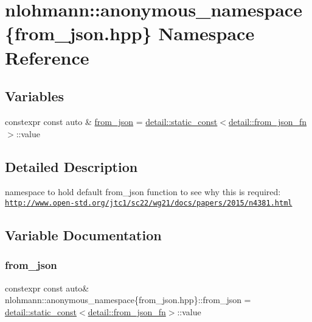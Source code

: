 \hypertarget{namespacenlohmann_1_1anonymous__namespace_02from__json_8hpp_03}{}\section{nlohmann\+:\+:anonymous\+\_\+namespace\{from\+\_\+json.\+hpp\} Namespace Reference}
\label{namespacenlohmann_1_1anonymous__namespace_02from__json_8hpp_03}
\subsection*{Variables}
\begin{DoxyCompactItemize}
\item 
constexpr const auto \& \hyperlink{namespacenlohmann_1_1anonymous__namespace_02from__json_8hpp_03_a8da2cbc27f4ff99aff5c20428fbcce4c}{from\+\_\+json} = \hyperlink{structnlohmann_1_1detail_1_1static__const}{detail\+::static\+\_\+const}$<$\hyperlink{structnlohmann_1_1detail_1_1from__json__fn}{detail\+::from\+\_\+json\+\_\+fn}$>$\+::value
\end{DoxyCompactItemize}


\subsection{Detailed Description}
namespace to hold default {\ttfamily from\+\_\+json} function to see why this is required\+: \href{http://www.open-std.org/jtc1/sc22/wg21/docs/papers/2015/n4381.html}{\tt http\+://www.\+open-\/std.\+org/jtc1/sc22/wg21/docs/papers/2015/n4381.\+html} 

\subsection{Variable Documentation}
\mbox{\label{namespacenlohmann_1_1anonymous__namespace_02from__json_8hpp_03_a8da2cbc27f4ff99aff5c20428fbcce4c}} 
\subsubsection{\texorpdfstring{from\+\_\+json}{from\_json}}
{\footnotesize\ttfamily constexpr const auto\& nlohmann\+::anonymous\+\_\+namespace\{from\+\_\+json.\+hpp\}\+::from\+\_\+json = \hyperlink{structnlohmann_1_1detail_1_1static__const}{detail\+::static\+\_\+const}$<$\hyperlink{structnlohmann_1_1detail_1_1from__json__fn}{detail\+::from\+\_\+json\+\_\+fn}$>$\+::value}

